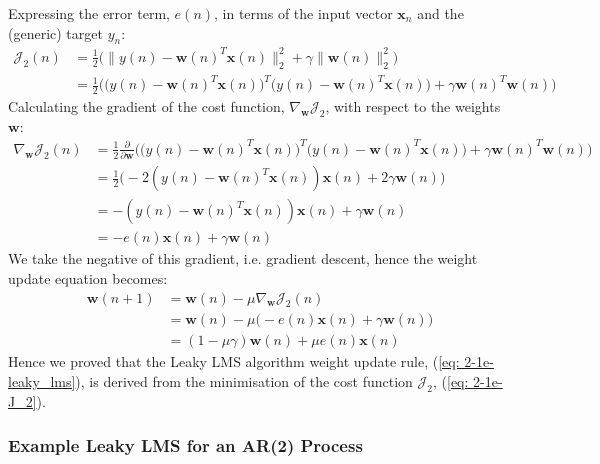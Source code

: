 \documentclass[12pt]{article}
\numberwithin{equation}{section}
\def\vw{{\bm{w}}}
\begin{document}
			Expressing the error term, $e(n)$, in terms of the input vector $\mathbf{x}_{n}$ and the (generic) target $y_{n}$:
			\begin{align}
			\mathcal{J}_{2}(n)  &= \frac{1}{2} \bigg( \| y(n) - \vw(n)^{T} \mathbf{x}(n) \|_{2}^{2} + \gamma \| \vw(n) \|_{2}^{2} \bigg) \\
							    &= \frac{1}{2} \bigg( \big( y(n) - \vw(n)^{T} \mathbf{x}(n))^{T} (y(n) - \vw(n)^{T} \mathbf{x}(n) \big) + \gamma \vw(n)^{T} \vw(n) \bigg)
			\end{align}
			\noindent
			Calculating the gradient of the cost function, $\nabla_{\vw} \mathcal{J}_{2}$, with respect to the weights $\vw$:
			\begin{align}
			\nabla_{\vw} \mathcal{J}_{2}(n) &= \frac{1}{2} \frac{\partial}{\partial\vw}\bigg( \big( y(n) - \vw(n)^{T} \mathbf{x}(n))^{T} (y(n) - \vw(n)^{T} \mathbf{x}(n) \big) + \gamma \vw(n)^{T} \vw(n) \bigg) \\
											&= \frac{1}{2} \big( -2 ( y(n) - \vw(n)^{T} \mathbf{x}(n) ) \mathbf{x}(n) + 2\gamma \vw(n) \big)\\
											&= - ( y(n) - \vw(n)^{T} \mathbf{x}(n) ) \mathbf{x}(n) + \gamma \vw(n) \\
											&= - e(n) \mathbf{x}(n) + \gamma \vw(n)
			\end{align}
			\noindent
			We take the negative of this gradient, i.e. gradient descent, hence the weight update equation becomes:
			\vspace*{-\baselineskip}
			\begin{align}
			\vw(n + 1)  &= \vw(n) - \mu \nabla_{\vw} \mathcal{J}_{2}(n) \\
						&= \vw(n) - \mu \big( - e(n) \mathbf{x}(n) + \gamma \vw(n) \big) \\
						&= (1 - \mu \gamma) \vw(n) + \mu e(n) \mathbf{x}(n)
			\label{eq: 2-1e-leaky_lms}
			\end{align}
			\noindent
			Hence we proved that the Leaky LMS algorithm weight update rule, (\ref{eq: 2-1e-leaky_lms}), is derived from the minimisation of the cost function $\mathcal{J}_{2}$, (\ref{eq: 2-1e-J_2}).
		\subsubsection{Example Leaky LMS for an AR(2) Process}  
		
\end{document}
